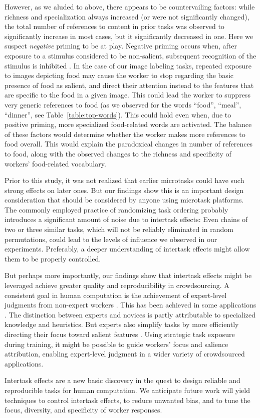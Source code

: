 \documentclass{sigchi}
\begin{document}
However, as we aluded to above, there appears to be countervailing factors:
while richness and specialization always increased (or were not 
significantly changed), the total number of references to content in 
prior tasks was observed to significantly increase in most cases, but
it significantly decreased in one.  Here we suspect 
\textit{negative} priming to be at play.
Negative priming occurs when, after exposure to a stimulus 
considered to be non-salient, subsequent recognition of the stimulus is 
inhibited \cite{mayr2007negative}.  In the case of our image labeling 
tasks, repeated exposure to images depicting food may cause the worker to 
stop regarding the basic presence of food as salient, and direct their 
attention instead to the features that are specific to the food in a given 
image.  This could lead the worker to suppress very generic references to 
food (as we observed for the words ``food'', ``meal'', ``dinner'', see 
Table~\ref{table:top-words}).  This could hold even when, due to positive
priming, more specialized food-related words are activated.
The balance of these factors would determine whether the worker makes 
more references to food overall.  This would explain the paradoxical
changes in number of references to food, along with the observed 
changes to the richness and specificity of workers' food-related 
vocabulary.

Prior to this study, it was not realized that earlier microtasks could 
have such strong effects on later ones.
But our findings show this is an important design consideration that 
should be considered by anyone using microtask platforms.
The commonly employed practice of randomizing task ordering probably
introduces a significant amount of noise due to intertask effects:
Even chains of two or three similar tasks, which will not be reliably 
eliminated in random permutations, could lead to the levels of influence 
we observed in our experiments.  Preferably, a deeper understanding of 
intertask effects might allow them to be properly controlled.

But perhaps more importantly, our findings show that intertask effects 
might be leveraged achieve greater quality and reproducibility in 
crowdsourcing.
A consistent goal in human computation is the achievement of expert-level
judgments from non-expert workers \cite{kittur2011crowdforge}.  
This has been achieved in some
applications \cite{snow2008cheap,Mortensen20131020,Warby2014385}. 
The distinction between experts and novices is partly attributable
to specialized knowledge and heuristics. 
But experts also simplify tasks by more efficiently directing 
their focus toward salient features \cite{kellman2009perceptual}.  
Using strategic task exposure during training, it might be possible to 
guide workers' focus and salience attribution, enabling expert-level 
judgment in a wider variety of crowdsourced applications.

Intertask effects are a new basic discovery
in the quest to design reliable and reproducible tasks for human 
computation.
We anticipate future work will yield techniques to control intertask 
effects, to reduce unwanted bias, and to tune the focus, diversity, and 
specificity of worker responses.



\end{document}
